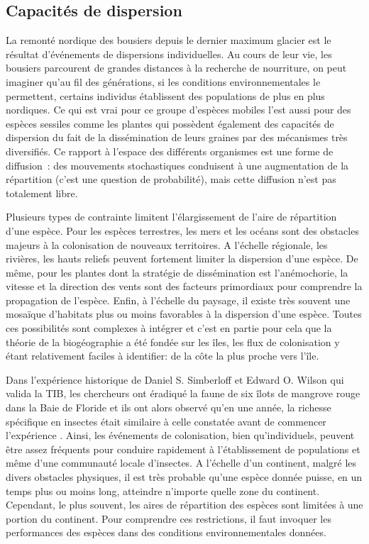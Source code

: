 \subsection*{Capacités de dispersion}\label{capacituxe9s-de-dispersion}

La remonté nordique des bousiers depuis le dernier maximum glacier est
le résultat d'événements de dispersions individuelles. Au cours de leur
vie, les bousiers parcourent de grandes distances à la recherche de
nourriture, on peut imaginer qu'au fil des générations, si les
conditions environnementales le permettent, certains individus
établissent des populations de plus en plus nordiques. Ce qui est vrai
pour ce groupe d'espèces mobiles l'est aussi pour des espèces sessiles
comme les plantes qui possèdent également des capacités de dispersion du
fait de la dissémination de leurs graines par des mécanismes très
diversifiés. Ce rapport à l'espace des différents organismes est une
forme de diffusion~: des mouvements stochastiques conduisent à une
augmentation de la répartition (c'est une question de probabilité), mais
cette diffusion n'est pas totalement libre.

Plusieurs types de contrainte limitent l'élargissement de l'aire de
répartition d'une espèce. Pour les espèces terrestres, les mers et les
océans sont des obstacles majeurs à la colonisation de nouveaux
territoires. A l'échelle régionale, les rivières, les hauts reliefs
peuvent fortement limiter la dispersion d'une espèce. De même, pour les
plantes dont la stratégie de dissémination est l'anémochorie, la vitesse
et la direction des vents sont des facteurs primordiaux pour comprendre
la propagation de l'espèce. Enfin, à l'échelle du paysage, il existe
très souvent une mosaïque d'habitats plus ou moins favorables à la
dispersion d'une espèce. Toutes ces possibilités sont complexes à
intégrer et c'est en partie pour cela que la théorie de la biogéographie
a été fondée sur les îles, les flux de colonisation y étant relativement
faciles à identifier: de la côte la plus proche vers l'île.

Dans l'expérience historique de Daniel S. Simberloff et Edward O. Wilson
qui valida la TIB, les chercheurs ont éradiqué la faune de six îlots de
mangrove rouge dans la Baie de Floride et ils ont alors observé qu'en
une année, la richesse spécifique en insectes était similaire à celle
constatée avant de commencer l'expérience \citep{Simberloff1969}. Ainsi,
les événements de colonisation, bien qu'individuels, peuvent être assez
fréquents pour conduire rapidement à l'établissement de populations et
même d'une communauté locale d'insectes. A l'échelle d'un continent,
malgré les divers obstacles physiques, il est très probable qu'une
espèce donnée puisse, en un temps plus ou moins long, atteindre
n'importe quelle zone du continent. Cependant, le plus souvent, les
aires de répartition des espèces sont limitées à une portion du
continent. Pour comprendre ces restrictions, il faut invoquer les
performances des espèces dans des conditions environnementales données.

